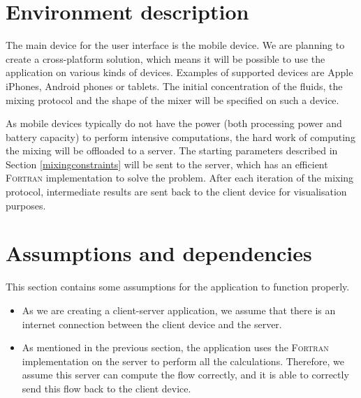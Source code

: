 \section{Environment description}
The main device for the user interface is the mobile device. We are planning to create a cross-platform solution, which means it will be possible to use the application on various kinds of devices. Examples of supported devices are Apple iPhones, Android phones or tablets. The initial concentration of the fluids, the mixing protocol and the shape of the mixer will be specified on such a device.

As mobile devices typically do not have the power (both processing power and battery capacity) to perform intensive computations, the hard work of computing the mixing will be offloaded to a server. The starting parameters described in Section \ref{mixingconstraints} will be sent to the server, which has an efficient \textsc{Fortran} implementation to solve the problem. After each iteration of the mixing protocol, intermediate results are sent back to the client device for visualisation purposes.

\section{Assumptions and dependencies}
This section contains some assumptions for the application to function properly.

\begin{itemize}
  \item As we are creating a client-server application, we assume that there is an internet connection between the client device and the server.
  \item As mentioned in the previous section, the application uses the \textsc{Fortran} implementation on the server to perform all the calculations. Therefore, we assume this server can compute the flow correctly, and it is able to correctly send this flow back to the client device.
\end{itemize}
